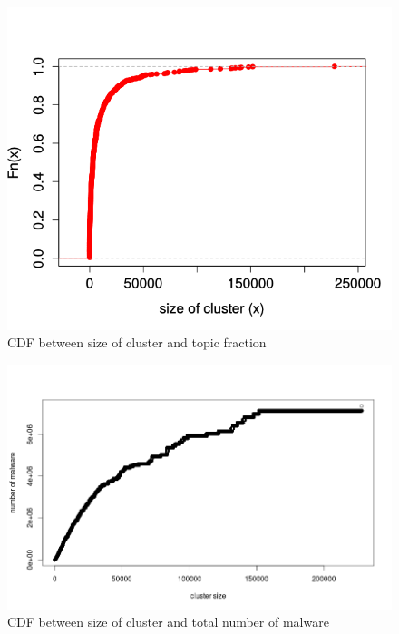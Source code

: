 \begin{figure}[htbp]
\begin{center}
  \includegraphics[scale=0.5]{figures/ecdfclustersize.png}
\end{center}
\caption{CDF between size of cluster and topic fraction}
\label{fig:ecdfclustersize}
\end{figure}
\begin{figure}[htbp]
\begin{center}
  \includegraphics[scale=0.3]{figures/cdfclusterlen2.png}
\end{center}
\caption{CDF between size of cluster and total number of malware}
\label{fig:cdfclusterlen}
\end{figure}
